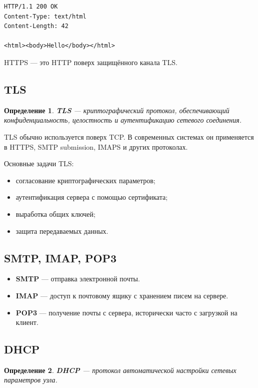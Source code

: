 \documentclass[12pt,a4paper]{article}
\newtheorem{definition}{Определение}
\begin{document}
\begin{lstlisting}
HTTP/1.1 200 OK
Content-Type: text/html
Content-Length: 42

<html><body>Hello</body></html>
\end{lstlisting}

HTTPS --- это HTTP поверх защищённого канала TLS.

\subsection{TLS}

\begin{definition}
\textbf{TLS} --- криптографический протокол, обеспечивающий конфиденциальность, целостность и аутентификацию сетевого соединения.
\end{definition}

TLS обычно используется поверх TCP. В современных системах он применяется в HTTPS, SMTP submission, IMAPS и других протоколах.

Основные задачи TLS:

\begin{itemize}
    \item согласование криптографических параметров;
    \item аутентификация сервера с помощью сертификата;
    \item выработка общих ключей;
    \item защита передаваемых данных.
\end{itemize}

\subsection{SMTP, IMAP, POP3}

\begin{itemize}
    \item \textbf{SMTP} --- отправка электронной почты.
    \item \textbf{IMAP} --- доступ к почтовому ящику с хранением писем на сервере.
    \item \textbf{POP3} --- получение почты с сервера, исторически часто с загрузкой на клиент.
\end{itemize}

\subsection{DHCP}

\begin{definition}
\textbf{DHCP} --- протокол автоматической настройки сетевых параметров узла.
\end{definition}
\end{document}
